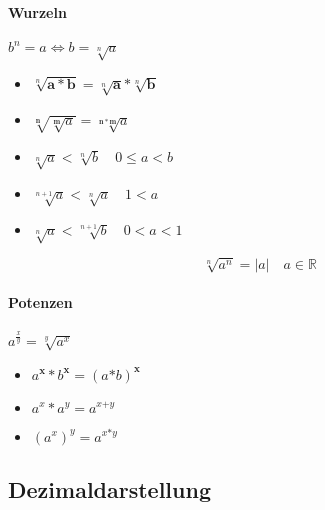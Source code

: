 \paragraph{Wurzeln} $b^n = a \Leftrightarrow b = \sqrt[n]{a}$

\begin{itemize}
      \item $\sqrt[n]{\mathbf{a * b}} = \sqrt[n]{\mathbf{a}} \mathbin{\boldsymbol{*}} \sqrt[n]{\mathbf{b}}$

      \item $\sqrt[\mathbf{n}]{ \sqrt[\mathbf{m}]{a} } = \sqrt[\mathbf{n * m}]{a}$

      \item $\sqrt[n]{a} < \sqrt[n]{b} \quad 0 \leq a < b$

      \item $\sqrt[n+1]{a} < \sqrt[n]{a} \quad 1 < a$

      \item $\sqrt[n]{a} < \sqrt[n+1]{b} \quad 0 < a < 1$
\end{itemize}

$$\sqrt[n]{a^n} = |a| \quad a \in \mathbb{R}$$

\paragraph{Potenzen} $a^{\frac{x}{y}} = \sqrt[y]{a^x}$

\begin{itemize}
      \item $a^{\mathbf{x}} * b^{\mathbf{x}} = (a \mathbf{*} b)^{\mathbf{x}}$

      \item $a^x * a^y = a^{x \boldsymbol{+} y}$

      \item $(a^x)^y = a^{x \boldsymbol{*} y}$

\end{itemize}

\subsection{Dezimaldarstellung}

